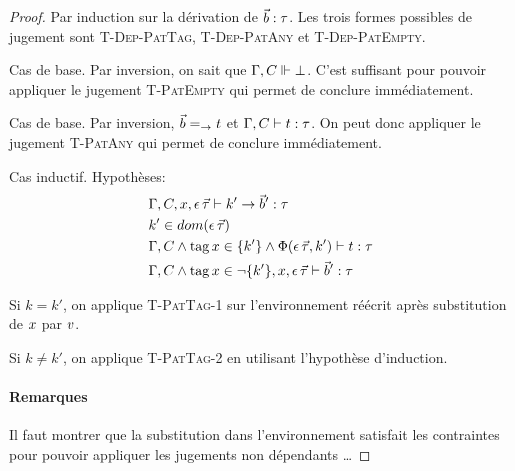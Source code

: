 \begin{lemma}
\begin{mathpar}
\end{mathpar}

\begin{proof}
  Par induction sur la dérivation de $\vec{b} : \ty$.
  Les trois formes possibles de jugement sont \textsc{T-Dep-PatTag},
  \textsc{T-Dep-PatAny} et \textsc{T-Dep-PatEmpty}.

  Cas de base. Par inversion, on sait que $\tyenv, \csenv \Vdash \bot$.
  C'est suffisant pour pouvoir appliquer le jugement \textsc{T-PatEmpty} qui permet de
  conclure immédiatement.

  Cas de base. Par inversion, $\vec{b} = _ \rightarrow \term$ et
  $\tycheck{\tyenv, \csenv}{\term}{\ty}$.
  On peut donc appliquer le jugement \textsc{T-PatAny} qui permet de
  conclure immédiatement.

  Cas inductif. Hypothèses:
\begin{equation*}
\begin{aligned}
  & \tycheck{\tyenv, \csenv, \var, \dtype}{k' \rightarrow \vec{b}'}{\ty} \\
  & k' \in dom({\dtype}) \\
  & \tycheck{\tyenv, \csenv \wedge \kw{tag} \var \in \{ k' \} \wedge \Phi(\dtype, k')}{\term}{\ty} \\
  & \tycheck{\tyenv, \csenv \wedge \kw{tag} \var \in \lnot \{ k' \}, \var, \dtype}{\vec{b}'}{\ty}
\end{aligned}
\end{equation*}

  Si $k = k'$, on applique \textsc{T-PatTag-1} sur l'environnement réécrit après
  substitution de $\var$ par $\val$.

  Si $k \neq k'$, on applique \textsc{T-PatTag-2} en utilisant l'hypothèse 
  d'induction.

  \paragraph{Remarques} Il faut montrer que la substitution dans
  l'environnement satisfait les contraintes pour pouvoir appliquer les
  jugements non dépendants \ldots
\end{proof}
\end{lemma}

